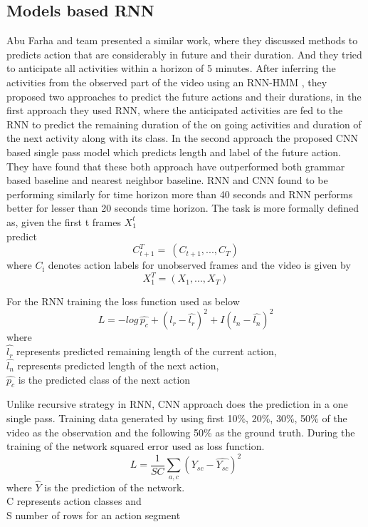 \subsection{Models based RNN }
\newpara Abu Farha and team presented \cite{abu2018will} a similar work, where they discussed methods to predicts action that are considerably in future and their duration. And they tried to anticipate all activities within a horizon of 5 minutes. After inferring the activities from the observed part of the video using an RNN-HMM \cite{richard2017weakly}, they proposed two approaches to predict the future actions and their durations, in the first approach they used RNN, where the anticipated activities are fed to the RNN to predict the remaining duration of the on going activities and duration of the next activity along with its class.
In the second approach the proposed CNN based single pass model which predicts length and label of the future action. They have found that these both approach have outperformed both grammar based baseline and nearest neighbor baseline. RNN and CNN found to be performing similarly for time horizon more than 40 seconds and RNN performs better for lesser than 20 seconds time horizon. The task is more formally defined as,
given the first t frames $X_{\text{1}}^t$ \\
predict \[ C_{t+1}^T  = \ (C_{t+1}, ..., C_{T}) \]
where $C_{\text{i}}$ denotes action labels for unobserved frames
and the video is given by
\[ X_{1}^T = (X_{1}, ..., X_{T}) \]

\newpara
For the RNN training the loss function used as below
\begin{equation}
    L = -log\, \hat{p_c} + (l_r - \hat{l_r})^2 +  I (l_n - \hat{l_n})^2 
\end{equation}
where \\
$\hat{l_r}$ represents predicted remaining length of the current action, \\
$\hat{l_n}$ represents predicted length of the next action, \\
$\hat{p_c}$ is the predicted class of the next action

\newpara Unlike recursive strategy in RNN, CNN approach does the prediction in a one single pass.
Training data generated by using first 10\%, 20\%, 30\%, 50\% of the video as the observation and the following 50\% as the ground truth. During the training of the network squared error used as loss function.
\begin{equation}
    L = \frac{1} {SC} \sum_{a,c} (Y_{sc} - \hat{Y_{sc}})^2 
\end{equation}
where $\hat{Y}$ is the prediction of the network. \\
C represents action classes and \\
S number of rows for an action segment

